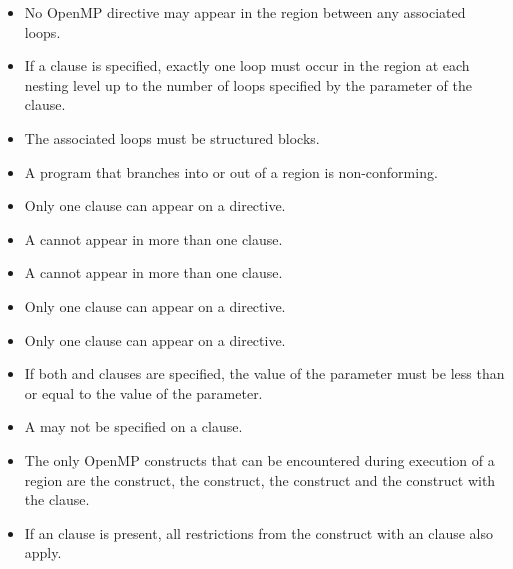 \restrictions
\begin{itemize}
\item No OpenMP directive may appear in the region between any associated loops.
\item If a  clause is specified, exactly one loop must
      occur in the region at each nesting level up to the number of loops
      specified by the parameter of the  clause.
\item The associated loops must be structured blocks.
\item A program that branches into or out of a  region is non-conforming.
\item Only one  clause can appear on a  directive.
\item A  cannot appear in more than one  clause.
\item A  cannot appear in more than one  clause.
\item Only one  clause can appear on a  directive.
\item Only one  clause can appear on a  directive.
\item If both  and  clauses are specified, the 
      value of the  parameter must be less than or equal to 
      the value of the  parameter.
\item A  may not be specified on a  clause.
\item The only OpenMP constructs that can be encountered during execution of a
       region are the  construct, the 
      construct, the  construct and the  construct with
      the  clause.
\item If an  clause is present, all restrictions from
      the  construct with an  clause also apply.




\end{itemize}
